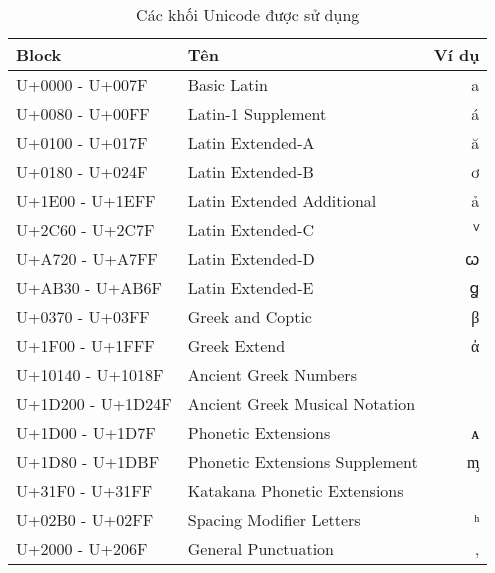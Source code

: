\begin{table}
    \centering
    \caption{Các khối Unicode được sử dụng}
    \label{table:unicode-blocks}
    \begin{threeparttable}
        \begin{tabular}{llr}
            \toprule
            \textbf{Block}    & \textbf{Tên}                            & \textbf{Ví dụ} \\\midrule
            U+0000 - U+007F   & Basic Latin                             & a              \\
            U+0080 - U+00FF   & Latin-1 Supplement                      & á              \\
            U+0100 - U+017F   & Latin Extended-A                        & ă              \\
            U+0180 - U+024F   & Latin Extended-B                        & ơ              \\
            U+1E00 - U+1EFF   & Latin Extended Additional               & ả              \\
            U+2C60 - U+2C7F   & Latin Extended-C                        & ⱽ              \\
            U+A720 - U+A7FF   & Latin Extended-D                        & ꞷ              \\
            U+AB30 - U+AB6F   & Latin Extended-E                        & ꬶ              \\
            U+0370 - U+03FF   & Greek and Coptic                        & β              \\
            U+1F00 - U+1FFF   & Greek Extend                            & ἀ              \\
            U+10140 - U+1018F & Ancient Greek Numbers\tnote{1}          &                \\
            U+1D200 - U+1D24F & Ancient Greek Musical Notation\tnote{2} &                \\
            U+1D00 - U+1D7F   & Phonetic Extensions                     & ᴀ              \\
            U+1D80 - U+1DBF   & Phonetic Extensions Supplement          & ᶆ              \\
            U+31F0 - U+31FF   & Katakana Phonetic Extensions\tnote{3}   &                \\
            U+02B0 - U+02FF   & Spacing Modifier Letters                & ʰ              \\
            U+2000 - U+206F   & General Punctuation                     & ‚              \\

\end{tabular}
\end{threeparttable}
\end{table}
